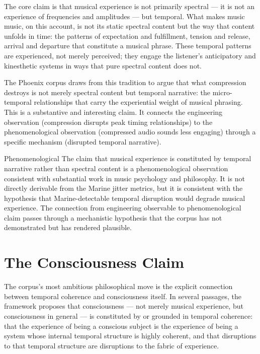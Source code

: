 The core claim is that musical experience is not primarily
spectral --- it is not an experience of frequencies and
amplitudes --- but temporal. What makes music music, on
this account, is not its static spectral content but the
way that content unfolds in time: the patterns of expectation
and fulfillment, tension and release, arrival and departure
that constitute a musical phrase. These temporal patterns
are experienced, not merely perceived; they engage the
listener's anticipatory and kinesthetic systems in ways
that pure spectral content does not.

The Phoenix corpus draws from this tradition to argue that
what compression destroys is not merely spectral content
but temporal narrative: the micro-temporal relationships
that carry the experiential weight of musical phrasing.
This is a substantive and interesting claim. It connects
the engineering observation (compression disrupts peak
timing relationships) to the phenomenological observation
(compressed audio sounds less engaging) through a specific
mechanism (disrupted temporal narrative).

\begin{epistemicstatus}{Phenomenological}
The claim that musical experience is constituted by temporal
narrative rather than spectral content is a phenomenological
observation consistent with substantial work in music
psychology and philosophy. It is not directly derivable
from the Marine jitter metrics, but it is consistent with
the hypothesis that Marine-detectable temporal disruption
would degrade musical experience. The connection from
engineering observable to phenomenological claim passes
through a mechanistic hypothesis that the corpus has not
demonstrated but has rendered plausible.
\end{epistemicstatus}

\section{The Consciousness Claim}
\label{sec:consciousness-claim}

The corpus's most ambitious philosophical move is the explicit
connection between temporal coherence and consciousness itself.
In several passages, the framework proposes that consciousness
--- not merely musical experience, but consciousness in general
--- is constituted by or grounded in temporal coherence: that
the experience of being a conscious subject is the experience
of being a system whose internal temporal structure is highly
coherent, and that disruptions to that temporal structure
are disruptions to the fabric of experience.

